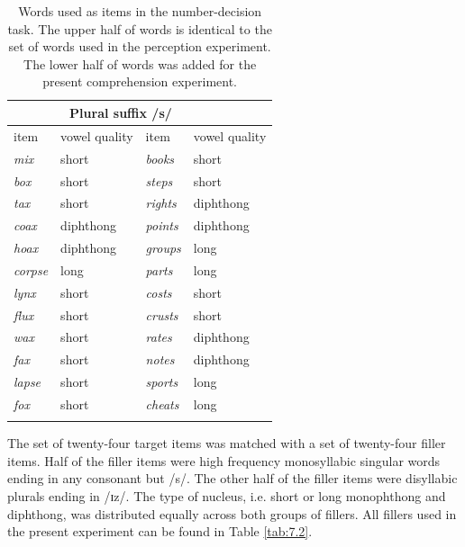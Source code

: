 \begin{table}\fontsize{10}{11}
\caption{Words used as items in the number-decision task. The upper half of words is identical to the set of words used in the perception experiment. The lower half of words was added for the present comprehension experiment.}
\label{tab:7.1}
\centering
\begin{tabular}{llll}
\lsptoprule
\multicolumn{2}{c}{Non-morphemic /s/} & \multicolumn{2}{c}{Plural suffix /s/}  \\
\midrule
item            & vowel quality       & item            & vowel quality        \\
\midrule
\textit{mix}    & short               & \textit{books}  & short                \\
\textit{box}    & short               & \textit{steps}  & short                \\
\textit{tax}    & short               & \textit{rights} & diphthong            \\
\textit{coax}   & diphthong           & \textit{points} & diphthong            \\
\textit{hoax}   & diphthong           & \textit{groups} & long                 \\
\textit{corpse} & long                & \textit{parts}  & long                 \\
\textit{lynx}   & short               & \textit{costs}  & short                \\
\textit{flux}   & short               & \textit{crusts} & short                \\
\textit{wax}    & short               & \textit{rates}  & diphthong            \\
\textit{fax}    & short               & \textit{notes}  & diphthong            \\
\textit{lapse}  & short               & \textit{sports} & long                 \\
\textit{fox}    & short               & \textit{cheats} & long                \\
\lspbottomrule
\end{tabular}
\end{table}

The set of twenty-four target items was matched with a set of twenty-four filler items. Half of the filler items were high frequency monosyllabic singular words ending in any consonant but /s/. The other half of the filler items were disyllabic plurals ending in /ɪz/. The type of nucleus, i.e. short or long monophthong and diphthong, was distributed equally across both groups of fillers. All fillers used in the present experiment can be found in Table \ref{tab:7.2}.

